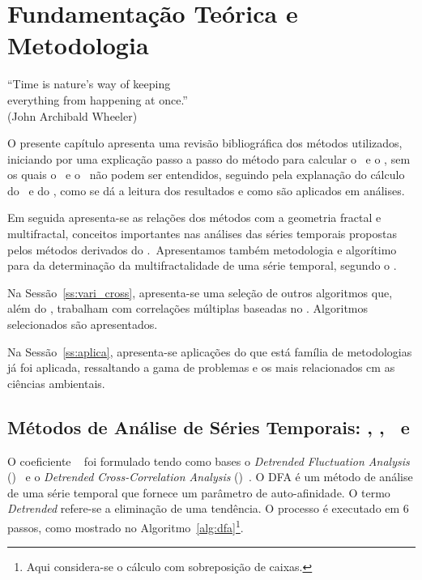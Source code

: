 \chapter{Fundamentação Teórica e Metodologia}
\label{cap:fund_teorica}

\begin{flushright}
  ``Time is nature's way of keeping \\
    everything from happening at once.''\\[10px]
  (John Archibald Wheeler)
\end{flushright}

O presente capítulo apresenta uma revisão bibliográfica dos métodos utilizados, iniciando por uma explicação passo a passo do método para calcular o \dfa~e o \dcca, sem os quais o \pdcca~e o \dmc~não podem ser entendidos, seguindo pela explanação do cálculo do \pdcca~e do \dmc, como se dá a leitura dos resultados e como são aplicados em análises.

Em seguida apresenta-se as relações dos métodos com a geometria fractal e multifractal, conceitos importantes nas análises das séries temporais propostas pelos métodos derivados do \dfa.~Apresentamos também metodologia e algorítimo para da determinação da multifractalidade de uma série temporal, segundo o \dfa.

Na Sessão~\ref{ss:vari_cross}, apresenta-se uma seleção de outros algoritmos que, além do \dmc, trabalham com correlações múltiplas baseadas no \dfa. Algoritmos selecionados são apresentados.

Na Sessão~\ref{ss:aplica}, apresenta-se aplicações do que está família de metodologias já foi aplicada, ressaltando a gama de problemas e os mais relacionados cm as ciências ambientais.

\section{Métodos de Análise de Séries Temporais: \dfa, \dcca, \pdcca~e \dmc}
\label{sec:dmc}

O coeficiente \pdcca~\cite{Zebende2011} foi formulado tendo como bases o \emph{Detrended Fluctuation Analysis} (\dfa)~\cite{Peng_1994} e o \emph{Detrended Cross-Correlation Analysis} (\dcca)~\cite{Podobnik2008}. O DFA é um método de análise de uma série temporal que fornece um parâmetro de auto-afinidade. O termo \emph{Detrended} refere-se a eliminação de uma tendência. O processo é executado em 6 passos, como mostrado no Algoritmo~\ref{alg:dfa}\footnote{Aqui considera-se o cálculo com sobreposição de caixas.}.


